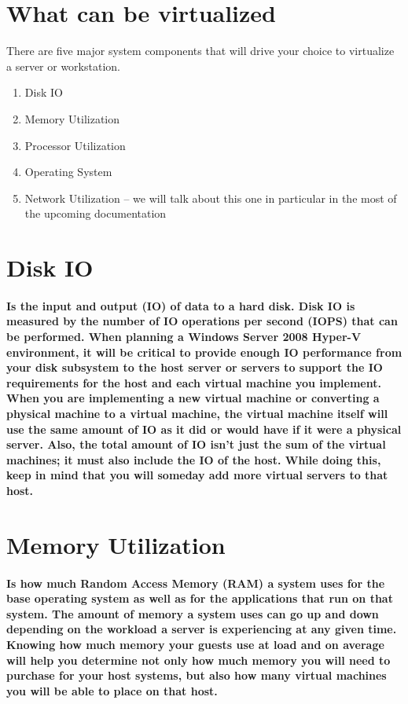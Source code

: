 \section{What can be virtualized}

There are five major system components that will drive your choice to virtualize a server or workstation.
\begin{enumerate}
\item Disk IO
\item Memory Utilization
\item Processor Utilization
\item Operating System
\item Network Utilization – we will talk about this one in particular in the most of the upcoming documentation
\end{enumerate}

\section{Disk IO}

\paragraph{Is the input and output (IO) of data to a hard disk. Disk IO is measured by the number of IO operations per second (IOPS) that can be performed. When planning a
Windows Server 2008 Hyper-V environment, it will be critical to provide enough IO performance from your disk subsystem to the host server or servers to support the IO 
requirements for the host and each virtual machine you implement. When you are implementing a new virtual machine or converting a physical machine to a virtual machine, 
the virtual machine itself will use the same amount of IO as it did or would have if it were a physical server. Also, the total amount of IO isn’t just the sum of the virtual 
machines; it must also include the IO of the host. While doing this, keep in mind that you will someday add more virtual servers to that host.}

\section{Memory Utilization}

\paragraph{Is how much Random Access Memory (RAM) a system uses for the base
operating system as well as for the applications that run on that system. The amount of memory a system uses can go up and down depending on the workload a server is experiencing
at any given time. Knowing how much memory your guests use at load and on average will help you determine not only how much memory you will need to purchase for your host
systems, but also how many virtual machines you will be able to place on that host.}

